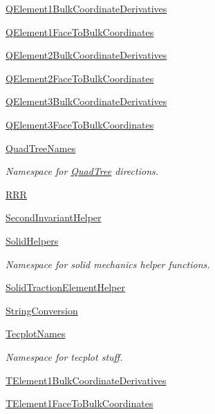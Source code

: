 \begin{DoxyCompactItemize}
 \hyperlink{namespaceoomph_1_1QElement1BulkCoordinateDerivatives}{Q\+Element1\+Bulk\+Coordinate\+Derivatives}
\item 
 \hyperlink{namespaceoomph_1_1QElement1FaceToBulkCoordinates}{Q\+Element1\+Face\+To\+Bulk\+Coordinates}
\item 
 \hyperlink{namespaceoomph_1_1QElement2BulkCoordinateDerivatives}{Q\+Element2\+Bulk\+Coordinate\+Derivatives}
\item 
 \hyperlink{namespaceoomph_1_1QElement2FaceToBulkCoordinates}{Q\+Element2\+Face\+To\+Bulk\+Coordinates}
\item 
 \hyperlink{namespaceoomph_1_1QElement3BulkCoordinateDerivatives}{Q\+Element3\+Bulk\+Coordinate\+Derivatives}
\item 
 \hyperlink{namespaceoomph_1_1QElement3FaceToBulkCoordinates}{Q\+Element3\+Face\+To\+Bulk\+Coordinates}
\item 
 \hyperlink{namespaceoomph_1_1QuadTreeNames}{Quad\+Tree\+Names}
\begin{DoxyCompactList}\small\item\em Namespace for \hyperlink{classoomph_1_1QuadTree}{Quad\+Tree} directions. \end{DoxyCompactList}\item 
 \hyperlink{namespaceoomph_1_1RRR}{R\+RR}
\item 
 \hyperlink{namespaceoomph_1_1SecondInvariantHelper}{Second\+Invariant\+Helper}
\item 
 \hyperlink{namespaceoomph_1_1SolidHelpers}{Solid\+Helpers}
\begin{DoxyCompactList}\small\item\em Namespace for solid mechanics helper functions. \end{DoxyCompactList}\item 
 \hyperlink{namespaceoomph_1_1SolidTractionElementHelper}{Solid\+Traction\+Element\+Helper}
\item 
 \hyperlink{namespaceoomph_1_1StringConversion}{String\+Conversion}
\item 
 \hyperlink{namespaceoomph_1_1TecplotNames}{Tecplot\+Names}
\begin{DoxyCompactList}\small\item\em Namespace for tecplot stuff. \end{DoxyCompactList}\item 
 \hyperlink{namespaceoomph_1_1TElement1BulkCoordinateDerivatives}{T\+Element1\+Bulk\+Coordinate\+Derivatives}
\item 
 \hyperlink{namespaceoomph_1_1TElement1FaceToBulkCoordinates}{T\+Element1\+Face\+To\+Bulk\+Coordinates}

\end{DoxyCompactItemize}
